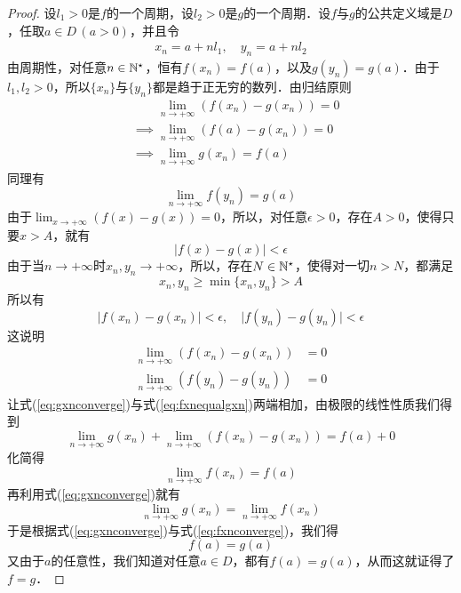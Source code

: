 \begin{proof}
设$l_1>0$是$f$的一个周期，设$l_2>0$是$g$的一个周期．设$f$与$g$的公共定义域是$D$，任取$a \in D \, (a > 0)$，并且令
\begin{align}
    x_n = a + n l_1, \quad y_n = a + n l_2
\end{align}
由周期性，对任意$n \in \mathbb{N}^\star$，恒有$f(x_n) = f(a)$，以及$g(y_n) = g(a)$．由于$l_1, l_2 > 0$，所以$\{ x_n \}$与$\{ y_n \}$都是趋于正无穷的数列．由归结原则
\begin{align}
    &\mathrel{\phantom{\implies}} \lim_{n \to +\infty} \left(f(x_n) - g(x_n)\right) = 0 \\
    &\implies \lim_{n \to +\infty} \left(f(a) - g(x_n)\right) = 0 \\
    &\implies \lim_{n \to +\infty} g(x_n) = f(a) \label{eq:gxnconverge}
\end{align}
同理有
\begin{equation}
    \lim_{n \to +\infty} f(y_n) = g(a) \label{eq:fxnconverge}
\end{equation}
由于$\displaystyle\lim_{x \to +\infty} \left(f(x) - g(x)\right) = 0$，所以，对任意$\epsilon > 0$，存在$A > 0$，使得只要$x > A$，就有
\begin{equation}
    \lvert f(x) - g(x) \rvert < \epsilon
\end{equation}
由于当$n \to +\infty$时$x_n, y_n \to +\infty$，所以，存在$N \in \mathbb{N}^\star$，使得对一切$n > N$，都满足
\begin{equation}
    x_n, y_n \geq \min \{ x_n, y_n \} > A
\end{equation}
所以有
\begin{equation}
\lvert f(x_n) - g(x_n) \rvert < \epsilon, \quad \lvert f(y_n) - g(y_n) \rvert < \epsilon
\end{equation}
这说明
\begin{align}
    \lim_{n \to +\infty} \left( f(x_n) - g(x_n) \right) &= 0 \label{eq:fxnequalgxn} \\
    \lim_{n \to +\infty} \left(f(y_n) - g(y_n)\right) &= 0 \label{eq:fynequalgyn}
\end{align}
让式(\ref{eq:gxnconverge})与式(\ref{eq:fxnequalgxn})两端相加，由极限的线性性质我们得到
\begin{equation}
    \lim_{n \to +\infty} g(x_n) + \lim_{n \to +\infty} \left(f(x_n) - g(x_n)\right) = f(a) + 0
\end{equation}
化简得
\begin{equation}
    \lim_{n \to +\infty} f(x_n) = f(a)
\end{equation}
再利用式(\ref{eq:gxnconverge})就有
\begin{equation}
    \lim_{n \to +\infty} g(x_n) = \lim_{n \to +\infty} f(x_n)
\end{equation}
于是根据式(\ref{eq:gxnconverge})与式(\ref{eq:fxnconverge})，我们得
\begin{equation}
    f(a) = g(a)
\end{equation}
又由于$a$的任意性，我们知道对任意$a \in D$，都有$f(a) = g(a)$，从而这就证得了$f = g$．
\end{proof}

